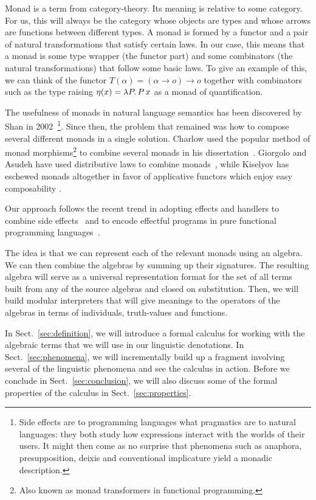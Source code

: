 \documentclass{llncs}
\begin{document}
Monad is a term from category-theory. Its meaning is relative to some
category. For us, this will always be the category whose objects are types
and whose arrows are functions between different types. A monad is formed
by a functor and a pair of natural transformations that satisfy certain
laws. In our case, this means that a monad is some type wrapper (the
functor part) and some combinators (the natural transformations) that
follow some basic laws. To give an example of this, we can think of the
functor $T(\alpha) = (\alpha \to o) \to o$ together with combinators such
as the type raising $\eta(x) = \lambda P.\, P\,x$ as a monad of
quantification.

The usefulness of monads in natural language semantics has been discovered
by Shan in 2002~\cite{shan2002monads}\footnote{Side effects are to
  programming languages what pragmatics are to natural languages: they both
  study how expressions interact with the worlds of their users. It might
  then come as no surprise that phenomena such as anaphora, presupposition,
  deixis and conventional implicature yield a monadic description.}. Since
then, the problem that remained was how to compose several different monads
in a single solution. Charlow used the popular method of monad
morphisms\footnote{Also known as monad transformers in functional
  programming.} to combine several monads in his
dissertation~\cite{charlow2014semantics}. Giorgolo and Asudeh have used
distributive laws to combine monads~\cite{giorgolo2015natural}, while
Kiselyov has eschewed monads altogether in favor of applicative functors
which enjoy easy composability \cite{kiselyov2015applicative}.

Our approach follows the recent trend in adopting effects and handlers to
combine side effects~\cite{bauer2012programming,kammar2013handlers} and to
encode effectful programs in pure functional programming
languages~\cite{kiselyov2013extensible,brady2013programming}.

The idea is that we can represent each of the relevant monads using an
algebra. We can then combine the algebras by summing up their
signatures. The resulting algebra will serve as a universal representation
format for the set of all terms built from any of the source algebras and
closed on substitution. Then, we will build modular interpreters that will
give meanings to the operators of the algebras in terms of individuals,
truth-values and functions.

In Sect.~\ref{sec:definition}, we will introduce a formal calculus for
working with the algebraic terms that we will use in our linguistic
denotations. In Sect.~\ref{sec:phenomena}, we will incrementally build up a
fragment involving several of the linguistic phenomena and see the calculus
in action. Before we conclude in Sect.~\ref{sec:conclusion}, we will also
discuss some of the formal properties of the calculus in
Sect.~\ref{sec:properties}.
\end{document}
